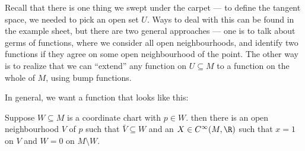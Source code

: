 \documentclass[a4paper]{article}
\begin{document}
Recall that there is one thing we swept under the carpet --- to define the tangent space, we needed to pick an open set $U$. Ways to deal with this can be found in the example sheet, but there are two general approaches --- one is to talk about germs of functions, where we consider all open neighbourhoods, and identify two functions if they agree on some open neighbourhood of the point. The other way is to realize that we can ``extend'' any function on $U \subseteq M$ to a function on the whole of $M$, using bump functions.

In general, we want a function that looks like this:
\begin{center}
\end{center}

\begin{lemma}
  Suppose $W \subseteq M$ is a coordinate chart with $p \in W$. then there is an open neighbourhood $V$ of $p$ such that $\bar{V} \subseteq W$ and an $X \in C^\infty(M, \R)$ such that $x = 1$ on $V$ and $W = 0$ on $M \setminus W$.
\end{lemma}
\end{document}
